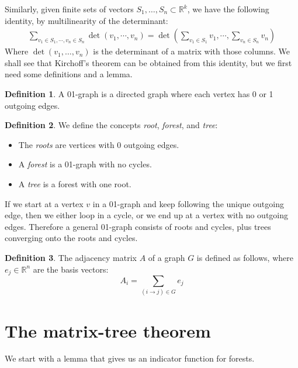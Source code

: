\documentclass[a4paper, 11pt]{article}
\newcommand{\R}{\mathbb{R}}
\theoremstyle{definition}
\newtheorem{definition}{Definition}[section]
\begin{document}
Similarly, given finite sets of vectors $S_1, \dots, S_n \subset \R^k$, we have the following identity, by multilinearity of the determinant:
\begin{align*}
  \sum_{v_1 \in S_1, \cdots, v_n \in S_n} \det \left(v_1, \cdots, v_n\right) =
  \det\left(\sum_{v_1 \in S_1} v_1, \cdots ,\sum_{v_n \in S_n} v_n\right)
\end{align*}
Where $\det(v_1, \dots, v_n)$ is the determinant of a matrix with those columns. We shall see that Kirchoff's theorem can be obtained from this identity, but we first need some definitions and a lemma.

\begin{definition}
  A 01-graph is a directed graph where each vertex has 0 or 1 outgoing edges.
\end{definition}

\begin{definition}
We define the concepts \emph{root}, \emph{forest}, and \emph{tree}:
 \begin{itemize}
  \item The \emph{roots} are vertices with 0 outgoing edges.
   \item A \emph{forest} is a 01-graph with no cycles.
   \item A \emph{tree} is a forest with one root.
 \end{itemize}
\end{definition}

If we start at a vertex $v$ in a 01-graph and keep following the unique outgoing edge, then we either loop in a cycle, or we end up at a vertex with no outgoing edges. Therefore a general 01-graph consists of roots and cycles, plus trees converging onto the roots and cycles.

\begin{definition}
  The adjacency matrix $A$ of a graph $G$ is defined as follows, where $e_j \in \R^n$ are the basis vectors:
  \[ A_i = \sum_{(i \to j) \in G} e_j  \]
\end{definition}

\section{The matrix-tree theorem}

We start with a lemma that gives us an indicator function for forests.
\end{document}
